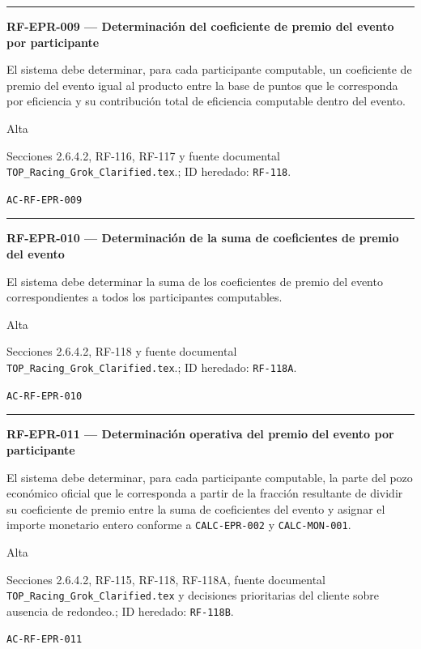 \documentclass[10pt,letterpaper]{article}
\begin{document}
\vspace{0.25em}\hrule\vspace{0.65em}
\noindent\textbf{RF-EPR-009 --- Determinación del coeficiente de premio del evento por participante}\par
\begin{description}[style=nextline,leftmargin=3.15cm,labelwidth=2.8cm,font=\normalfont\bfseries]
\item[Obligación] El sistema debe determinar, para cada participante computable, un coeficiente de premio del evento igual al producto entre la base de puntos que le corresponda por eficiencia y su contribución total de eficiencia computable dentro del evento.
\item[Prioridad] Alta
\item[Procedencia] Secciones 2.6.4.2, RF-116, RF-117 y fuente documental \texttt{TOP\_Racing\_Grok\_Clarified.tex}.; ID heredado: \texttt{RF-118}.
\item[Verificación] \texttt{AC-RF-EPR-009}
\end{description}
\vspace{0.25em}\hrule\vspace{0.65em}
\noindent\textbf{RF-EPR-010 --- Determinación de la suma de coeficientes de premio del evento}\par
\begin{description}[style=nextline,leftmargin=3.15cm,labelwidth=2.8cm,font=\normalfont\bfseries]
\item[Obligación] El sistema debe determinar la suma de los coeficientes de premio del evento correspondientes a todos los participantes computables.
\item[Prioridad] Alta
\item[Procedencia] Secciones 2.6.4.2, RF-118 y fuente documental \texttt{TOP\_Racing\_Grok\_Clarified.tex}.; ID heredado: \texttt{RF-118A}.
\item[Verificación] \texttt{AC-RF-EPR-010}
\end{description}
\vspace{0.25em}\hrule\vspace{0.65em}
\noindent\textbf{RF-EPR-011 --- Determinación operativa del premio del evento por participante}\par
\begin{description}[style=nextline,leftmargin=3.15cm,labelwidth=2.8cm,font=\normalfont\bfseries]
\item[Obligación] El sistema debe determinar, para cada participante computable, la parte del pozo económico oficial que le corresponda a partir de la fracción resultante de dividir su coeficiente de premio entre la suma de coeficientes del evento y asignar el importe monetario entero conforme a \texttt{CALC-EPR-002} y \texttt{CALC-MON-001}.
\item[Prioridad] Alta
\item[Procedencia] Secciones 2.6.4.2, RF-115, RF-118, RF-118A, fuente documental \texttt{TOP\_Racing\_Grok\_Clarified.tex} y decisiones prioritarias del cliente sobre ausencia de redondeo.; ID heredado: \texttt{RF-118B}.
\item[Verificación] \texttt{AC-RF-EPR-011}
\end{description}
\end{document}
